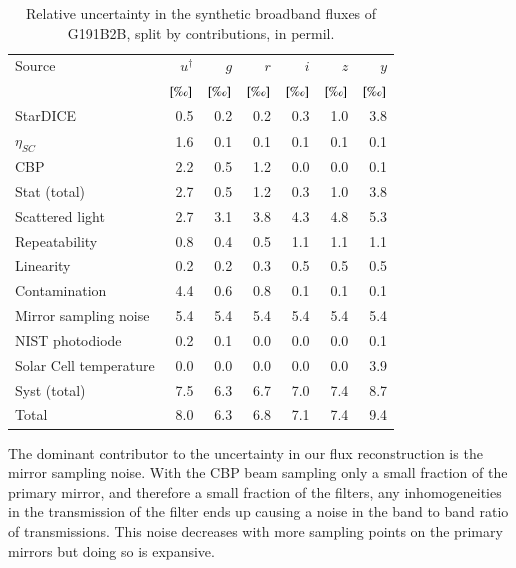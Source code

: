 \begin{table}
  \centering
  \caption{Relative uncertainty in the synthetic broadband fluxes of
    G191B2B, split by contributions, in permil.}
  \label{tab:budget}
  \begin{tabular}{lrrrrrr}
    \toprule
    \toprule
    Source & $u^\dag$ & $g$ & $r$ & $i$ & $z$ & $y$ \\
    & $[\text{\textperthousand}]$ & $[\text{\textperthousand}]$ & $[\text{\textperthousand}]$ & $[\text{\textperthousand}]$ & $[\text{\textperthousand}]$ & $[\text{\textperthousand}]$\\
    \midrule
    StarDICE & 0.5 & 0.2 & 0.2 & 0.3 & 1.0 & 3.8 \\
    $\eta_{SC}$ & 1.6 & 0.1 & 0.1 & 0.1 & 0.1 & 0.1 \\
    CBP & 2.2 & 0.5 & 1.2 & 0.0 & 0.0 & 0.1 \\
    \midrule
    Stat (total) & 2.7 & 0.5 & 1.2 & 0.3 & 1.0 & 3.8 \\
    \midrule
    Scattered light & 2.7 & 3.1 & 3.8 & 4.3 & 4.8 & 5.3 \\
    Repeatability & 0.8 & 0.4 & 0.5 & 1.1 & 1.1 & 1.1 \\
    Linearity & 0.2 & 0.2 & 0.3 & 0.5 & 0.5 & 0.5 \\
    Contamination & 4.4 & 0.6 & 0.8 & 0.1 & 0.1 & 0.1 \\
    Mirror sampling noise & 5.4 & 5.4 & 5.4 & 5.4 & 5.4 & 5.4 \\
    NIST photodiode & 0.2 & 0.1 & 0.0 & 0.0 & 0.0 & 0.1 \\
    Solar Cell temperature & 0.0 & 0.0 & 0.0 & 0.0 & 0.0 & 3.9 \\
    \midrule
    Syst (total) & 7.5 & 6.3 & 6.7 & 7.0 & 7.4 & 8.7 \\
    \midrule
    Total & 8.0 & 6.3 & 6.8 & 7.1 & 7.4 & 9.4 \\
    \bottomrule
  \end{tabular}
\end{table}

The dominant contributor to the uncertainty in our flux reconstruction
is the mirror sampling noise. With the CBP beam sampling only a small
fraction of the primary mirror, and therefore a small fraction of the
filters, any inhomogeneities in the transmission of the filter ends up
causing a noise in the band to band ratio of transmissions. This noise
decreases with more sampling points on the primary mirrors but doing
so is expansive.

